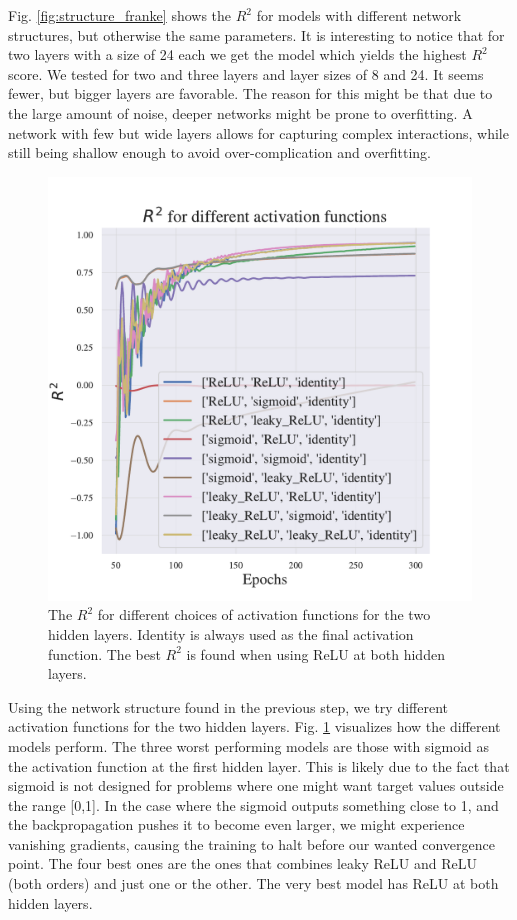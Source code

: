 Fig. \ref{fig:structure_franke} shows the $R^2$ for models with different network structures, but otherwise the same parameters. It is interesting to notice that for two layers with a size of 24 each we get the model which yields the highest $R^2$ score. We tested for two and three layers and layer sizes of 8 and 24. 
It seems fewer, but bigger layers are favorable. 
The reason for this might be that due to the large amount of noise, deeper networks might be prone to overfitting.
A network with few but wide layers allows for capturing complex interactions, while still being shallow enough to avoid over-complication and overfitting.

\begin{figure}[h!]
    \centering
    \includegraphics[width=1.0\linewidth]{project_2/figures/$R^2$ for different activation functions_continuous.pdf}
    \caption{The $R^2$ for different choices of activation functions for the two hidden layers. Identity is always used as the final activation function. The best $R^2$ is found when using ReLU at both hidden layers.}
    \label{fig:activation_franke}
\end{figure}

Using the network structure found in the previous step, we try different activation functions for the two hidden layers. 
Fig. \ref{fig:activation_franke} visualizes how the different models perform. 
The three worst performing models are those with sigmoid as the activation function at the first hidden layer. 
This is likely due to the fact that sigmoid is not designed for problems where one might want target values outside the range [0,1].
In the case where the sigmoid outputs something close to 1, and the backpropagation pushes it to become even larger, we might experience vanishing gradients, causing the training to halt before our wanted convergence point.
The four best ones are the ones that combines leaky ReLU and ReLU (both orders) and just one or the other. 
The very best model has ReLU at both hidden layers. 

